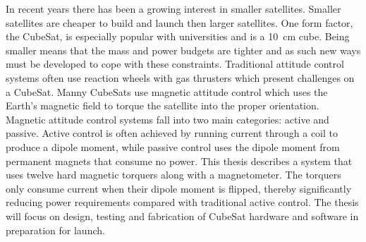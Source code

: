 In recent years there has been a growing interest in smaller satellites. Smaller satellites are cheaper to build and launch then larger satellites. One form factor, the CubeSat, is especially popular with universities and is a 10~cm cube. Being smaller means that the mass and power budgets are tighter and as such new ways must be developed to cope with these constraints. Traditional attitude control systems often use reaction wheels with gas thrusters which present challenges on a CubeSat. Manny CubeSats use magnetic attitude control which uses the Earth's magnetic field to torque the satellite into the proper orientation. Magnetic attitude control systems fall into two main categories: active and passive. Active control is often achieved by running current through a coil to produce a dipole moment, while passive control uses the dipole moment from permanent magnets that consume no power. This thesis describes a system that uses twelve hard magnetic torquers along with a magnetometer. The torquers only consume current when their dipole moment is flipped, thereby significantly reducing power requirements compared with traditional active control. The thesis will focus on design, testing and fabrication of CubeSat hardware and software in preparation for launch.

